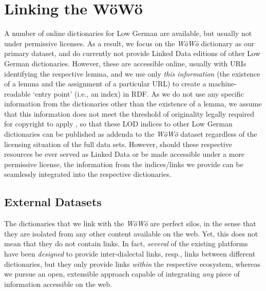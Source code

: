 \section{Linking the WöWö}

A number of online dictionaries for Low German are available, but usually not under permissive licenses. As a result, we focus on the \emph{WöWö} dictionary as our primary dataset, and do currently not provide Linked Data editions of other Low German dictionaries. However, these are accessible online, usually with URIs identifying the respective lemma, and we use only \emph{this information} (the existence of a lemma and the assignment of a particular URL) to create a machine-readable `entry point' (i.e., an index) in RDF. As we do not use any specific information from the dictionaries other than the existence of a lemma, we assume that this information does not meet the threshold of originality legally required for copyright to apply \citet{Margoni2016},
so that these LOD indices to other Low German dictionaries can be published as addenda to the \emph{WöWö} dataset regardless of the licensing situation of the full data sets. However, should these respective resources be ever served as Linked Data or be made accessible under a more permissive license, the information from the indices/links we provide can be seamlessly integrated into the respective dictionaries.

\subsection{External Datasets}

The dictionaries that we link with the \emph{WöWö} are perfect silos, in the sense that they are isolated from any other content available on the web. Yet, this does not mean that they do not contain links. In fact, \emph{several} of the existing platforms have been \emph{designed} to provide inter-dialectal links, resp., links between different dictionaries, but they only provide links \emph{within} the respective ecosystem, whereas we pursue an open, extensible approach capable of integrating \emph{any} piece of information accessible on the web. 

